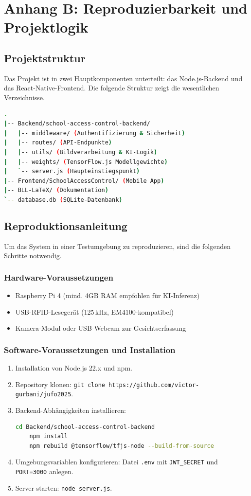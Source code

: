 \section{Anhang B: Reproduzierbarkeit und Projektlogik}

\subsection{Projektstruktur}
Das Projekt ist in zwei Hauptkomponenten unterteilt: das Node.js-Backend und das React-Native-Frontend. Die folgende Struktur zeigt die wesentlichen Verzeichnisse.
\begin{lstlisting}[language=bash]
.
|-- Backend/school-access-control-backend/
|   |-- middleware/ (Authentifizierung & Sicherheit)
|   |-- routes/ (API-Endpunkte)
|   |-- utils/ (Bildverarbeitung & KI-Logik)
|   |-- weights/ (TensorFlow.js Modellgewichte)
|   `-- server.js (Haupteinstiegspunkt)
|-- Frontend/SchoolAccessControl/ (Mobile App)
|-- BLL-LaTeX/ (Dokumentation)
`-- database.db (SQLite-Datenbank)
\end{lstlisting}

\subsection{Reproduktionsanleitung}
Um das System in einer Testumgebung zu reproduzieren, sind die folgenden Schritte notwendig.

\subsubsection{Hardware-Voraussetzungen}
\begin{itemize}
  \item Raspberry Pi 4 (mind. 4GB RAM empfohlen für KI-Inferenz)
  \item USB-RFID-Lesegerät (125\,kHz, EM4100-kompatibel)
  \item Kamera-Modul oder USB-Webcam zur Gesichtserfassung
\end{itemize}

\subsubsection{Software-Voraussetzungen und Installation}
\begin{enumerate}
  \item Installation von Node.js 22.x und npm.
  \item Repository klonen: \texttt{git clone https://github.com/victor-gurbani/jufo2025}.
  \item Backend-Abhängigkeiten installieren:
    \begin{lstlisting}[language=bash]
    cd Backend/school-access-control-backend
    npm install
    npm rebuild @tensorflow/tfjs-node --build-from-source
    \end{lstlisting}
  \item Umgebungsvariablen konfigurieren: Datei \texttt{.env} mit \texttt{JWT\_SECRET} und \texttt{PORT=3000} anlegen.
  \item Server starten: \texttt{node server.js}.
\end{enumerate}

